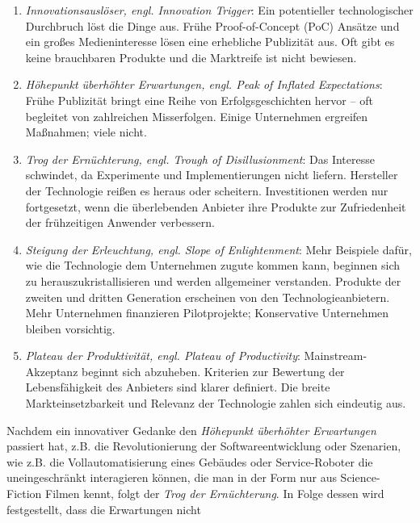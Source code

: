     \begin{enumerate}
        \item \textit{Innovationsauslöser, engl. Innovation Trigger}: Ein potentieller technologischer Durchbruch 
        löst die Dinge aus. Frühe Proof-of-Concept (PoC) Ansätze und ein großes Medieninteresse lösen eine 
        erhebliche Publizität aus. Oft gibt es keine brauchbaren Produkte und die Marktreife ist nicht 
        bewiesen. \cite{gartner.2022m}
        \item \textit{Höhepunkt überhöhter Erwartungen, engl. Peak of Inflated Expectations}: Frühe Publizität 
        bringt eine Reihe von Erfolgsgeschichten hervor – oft begleitet von zahlreichen Misserfolgen. 
        Einige Unternehmen ergreifen Maßnahmen; viele nicht. \cite{gartner.2022m}
        \item \textit{Trog der Ernüchterung, engl. Trough of Disillusionment}: Das Interesse schwindet, da 
        Experimente und Implementierungen nicht liefern. Hersteller der Technologie reißen es heraus 
        oder scheitern. Investitionen werden nur fortgesetzt, wenn die überlebenden Anbieter ihre Produkte 
        zur Zufriedenheit der frühzeitigen Anwender verbessern. \cite{gartner.2022m}
        \item \textit{Steigung der Erleuchtung, engl. Slope of Enlightenment}: Mehr Beispiele dafür, wie 
        die Technologie dem Unternehmen zugute kommen kann, beginnen sich zu herauszukristallisieren und 
        werden allgemeiner verstanden. Produkte der zweiten und dritten Generation erscheinen von den 
        Technologieanbietern. Mehr Unternehmen finanzieren Pilotprojekte; Konservative Unternehmen 
        bleiben vorsichtig. \cite{gartner.2022m}
        \item \textit{Plateau der Produktivität, engl. Plateau of Productivity}: Mainstream-Akzeptanz beginnt 
        sich abzuheben. Kriterien zur Bewertung der Lebensfähigkeit des Anbieters sind klarer definiert. 
        Die breite Markteinsetzbarkeit und Relevanz der Technologie zahlen sich eindeutig aus. \cite{gartner.2022m}
    \end{enumerate}
    Nachdem ein innovativer Gedanke den \textit{Höhepunkt überhöhter Erwartungen} passiert hat, z.B. die 
    Revolutionierung der Softwareentwicklung oder Szenarien, wie z.B. die Vollautomatisierung eines Gebäudes 
    oder Service-Roboter die uneingeschränkt interagieren können, die man in der Form nur aus Science-Fiction Filmen kennt, 
    folgt der \textit{Trog der Ernüchterung}. In Folge dessen wird festgestellt, dass die Erwartungen nicht 
